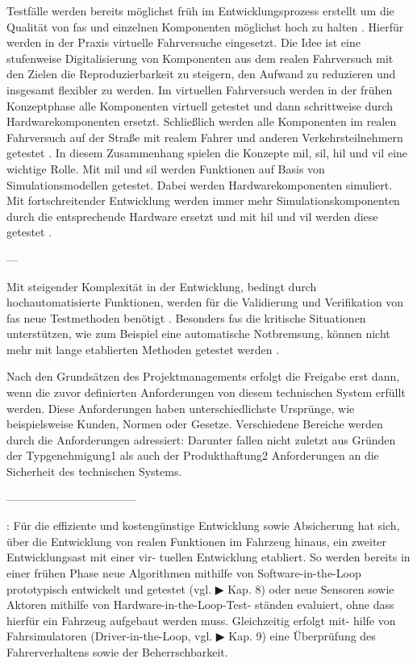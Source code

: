 Testfälle werden bereits möglichst früh im Entwicklungsprozess erstellt um die Qualität von \gls{fas} und einzelnen Komponenten möglichst hoch zu halten \cite{wachenfeld2015freigabe}. Hierfür werden in der Praxis virtuelle Fahrversuche eingesetzt. Die Idee ist eine stufenweise Digitalisierung von Komponenten aus dem realen Fahrversuch mit den Zielen die Reproduzierbarkeit zu steigern, den Aufwand zu reduzieren und insgesamt flexibler zu werden. Im virtuellen Fahrversuch werden in der frühen Konzeptphase alle Komponenten virtuell getestet und dann schrittweise durch Hardwarekomponenten ersetzt. Schließlich werden alle Komponenten im realen Fahrversuch auf der Straße mit realem Fahrer und anderen Verkehrsteilnehmern getestet \cite{hakuli2015virtuelle}. In diesem Zusammenhang spielen die Konzepte \gls{mil}, \gls{sil}, \gls{hil} und \gls{vil} eine wichtige Rolle. Mit \gls{mil} und \gls{sil} werden Funktionen auf Basis von Simulationsmodellen getestet. Dabei werden Hardwarekomponenten simuliert. Mit fortschreitender Entwicklung werden immer mehr Simulationskomponenten durch die entsprechende Hardware ersetzt und mit \gls{hil} und \gls{vil} werden diese getestet \cite{hakuli2015virtuelle}.

---

Mit steigender Komplexität in der Entwicklung, bedingt durch hochautomatisierte Funktionen, werden für die Validierung und Verifikation von \gls{fas} neue Testmethoden benötigt \cite{bach2017reactive}. Besonders \gls{fas} die kritische Situationen unterstützen, wie zum Beispiel eine automatische Notbremsung, können nicht mehr mit lange etablierten Methoden getestet werden \cite{bock2008vehicle}. 







Nach den Grundsätzen des Projektmanagements erfolgt die Freigabe erst dann, wenn die zuvor definierten Anforderungen von diesem technischen System erfüllt werden. Diese Anforderungen haben unterschiedlichste Ursprünge, wie beispielsweise Kunden, Normen oder Gesetze. Verschiedene Bereiche werden durch die Anforderungen adressiert: Darunter fallen nicht zuletzt aus Gründen der Typgenehmigung1 als auch der Produkthaftung2 Anforderungen an die Sicherheit des technischen Systems. \cite{wachenfeld2015freigabe}


-----------------------------------


\cite{berg2015vehicle}:
Für die effiziente und kostengünstige Entwicklung sowie Absicherung hat sich, über die Entwicklung von realen Funktionen im Fahrzeug hinaus, ein zweiter Entwicklungsast mit einer vir- tuellen Entwicklung etabliert. So werden bereits in einer frühen Phase neue Algorithmen mithilfe von Software-in-the-Loop prototypisch entwickelt und getestet (vgl. ▶ Kap. 8) oder neue Sensoren sowie Aktoren mithilfe von Hardware-in-the-Loop-Test- ständen evaluiert, ohne dass hierfür ein Fahrzeug aufgebaut werden muss. Gleichzeitig erfolgt mit- hilfe von Fahrsimulatoren (Driver-in-the-Loop, vgl. ▶ Kap. 9) eine Überprüfung des Fahrerverhaltens sowie der Beherrschbarkeit.

